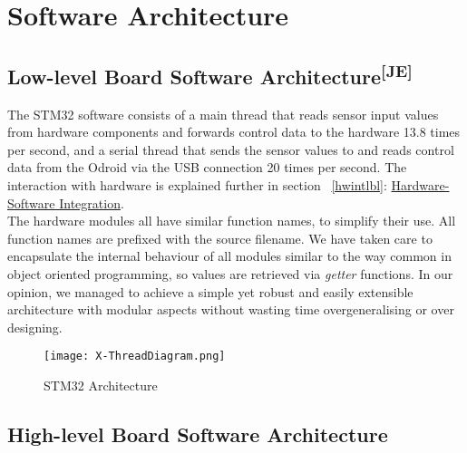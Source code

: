 \chapter{Software Architecture}
\hypertarget{satgt}{}
\label{salbl}
\section[Low-level Board Software Architecture]
{Low-level Board Software Architecture\textsuperscript{[JE]}}
The STM32 software consists of a main thread that reads sensor input values from
hardware components and forwards control data to the hardware 13.8 times per
second, and a serial thread that sends the sensor values to and reads control
data from the Odroid via the USB connection 20 times per second. The interaction
with hardware is explained further in section ~\ref{hwintlbl}:
\hyperlink{hwinttgt}{Hardware-Software Integration}.\\

\noindent
The hardware modules all have similar function names, to simplify their use. All
function names are prefixed with the source filename. We have taken care to
encapsulate the internal behaviour of all modules similar to the way common in
object oriented programming, so values are retrieved via \textit{getter}
functions. In our opinion, we managed to achieve a simple yet robust and easily
extensible architecture with modular aspects without wasting time
overgeneralising or over designing.
\newpage
\begin{figure}[ht]
  \centering
  \texttt{[image: X-ThreadDiagram.png]}
  \caption{STM32 Architecture}
  \label{xtdiagr}
\end{figure}

\newpage
\section{High-level Board Software Architecture}

